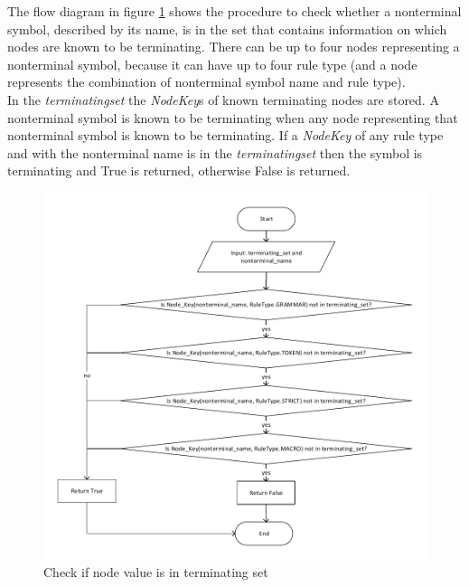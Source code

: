 The flow diagram in figure \ref{fig:ImplementationCheckIfValueInTerminating} shows the procedure to check whether a nonterminal symbol, described by its name, is in the set that contains information on which nodes are known to be terminating.
There can be up to four nodes representing a nonterminal symbol, because it can have up to four rule type (and a node represents the combination of nonterminal symbol name and rule type).\\
In the \textit{terminating\textunderscore set} the \textit{NodeKey}s of known terminating nodes are stored.
A nonterminal symbol is known to be terminating when any node representing that nonterminal symbol is known to be terminating.
If a \textit{NodeKey} of any rule type and  with the nonterminal name is in the \textit{terminating\textunderscore set} then the symbol is terminating and True is returned, otherwise False is returned.
\begin{figure}[H]
\centering
\includegraphics[width=1\textwidth]{images/Implementation_value_in_terminating.pdf}
\caption{Check if node value is in terminating set}
\label{fig:ImplementationCheckIfValueInTerminating}
\end{figure}


